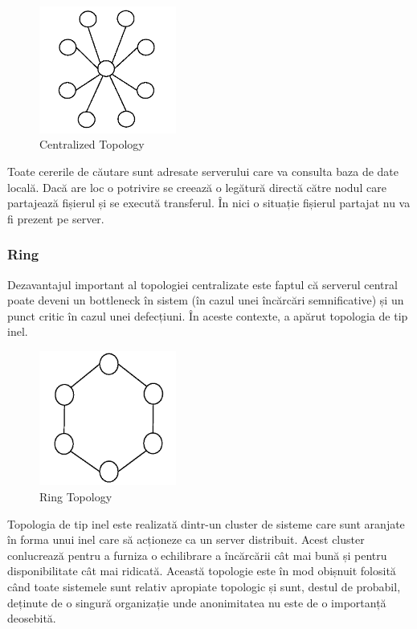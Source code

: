 \begin{figure}
  \centering
  \includegraphics[width=0.4\textwidth]{src/img/p2p-systems/centralized}
  \caption{Centralized Topology}
  \label{fig:p2p-systems:centralized}
\end{figure}

Toate cererile de căutare sunt adresate serverului care va consulta baza de
date locală. Dacă are loc o potrivire se creează o legătură directă către
nodul care partajează fișierul și se execută transferul. În nici o situație
fișierul partajat nu va fi prezent pe server.

\subsubsection{Ring}

Dezavantajul important al topologiei centralizate este faptul că serverul
central poate deveni un bottleneck în sistem (în cazul unei încărcări
semnificative) și un punct critic în cazul unei defecțiuni. În aceste
contexte, a apărut topologia de tip inel.

\begin{figure}
  \centering
  \includegraphics[width=0.4\textwidth]{src/img/p2p-systems/ring}
  \caption{Ring Topology}
  \label{fig:p2p-systems:ring}
\end{figure}

Topologia de tip inel este realizată dintr-un cluster de sisteme care sunt
aranjate în forma unui inel care să acționeze ca un server distribuit. Acest
cluster conlucrează pentru a furniza o echilibrare a încărcării cât mai bună
și pentru disponibilitate cât mai ridicată. Această topologie este în mod
obișnuit folosită când toate sistemele sunt relativ apropiate topologic și
sunt, destul de probabil, deținute de o singură organizație unde anonimitatea
nu este de o importanță deosebită.

